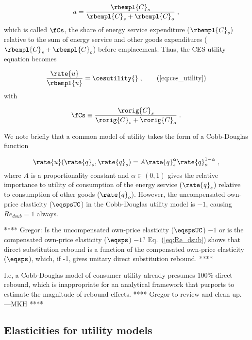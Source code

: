 \begin{equation}
  a = \frac{\rbempl{C}_s}{\rbempl{C}_s + \rbempl{C}_o} \; ,
\end{equation}
%
which is called $\fCs$, 
the share of energy service expenditure ($\rbempl{C}_s$) 
relative to the sum of energy service and other goods expenditures 
($\rbempl{C}_s + \rbempl{C}_o$) 
before emplacement.
Thus, the CES utility equation becomes

\begin{equation} 
    \frac{\rate{u}}{\rbempl{u}} = \cesutility{} \; , \tag{\ref{eq:ces_utility}}
\end{equation}
%
with 

\begin{equation} \label{eq:fCs}
  \fCs \equiv \frac{\rorig{C}_s}{\rorig{C}_s + \rorig{C}_o} \; .
\end{equation}

We note briefly that 
a common model of utility takes the form of a Cobb-Douglas function

\begin{equation} \label{eq:CD_utility}
  \rate{u}(\rate{q}_s,\rate{q}_o) = A \rate{q}_s^\alpha \rate{q}_o^{1 - \alpha} \; ,
\end{equation}
%
where $A$ is a proportionality constant and
$\alpha \in (0,1)$ gives the relative importance to utility
of consumption of the energy service ($\rate{q}_s$)
relative to consumption of other goods ($\rate{q}_o$).
However, the uncompensated own-price elasticity ($\eqspsUC$)
in the Cobb-Douglas utility model is $-1$,
causing $Re_{dsub} = 1$ always.

**** Gregor: Is the uncompensated own-price elasticity ($\eqspsUC$) $-1$
or is the compensated own-price elasticity ($\eqsps$) $-1$?
Eq.~(\ref{eq:Re_dsub}) shows that direct substitution rebound is a function of the
compensated own-price elasticity ($\eqsps$), which, if -1, gives unitary direct substitution rebound.
****

I.e, a Cobb-Douglas model of consumer utility already presumes 100\% direct rebound,
which is inappropriate for an analytical framework that purports to
estimate the magnitude of rebound effects.
**** Gregor to review and clean up. ---MKH ****


\subsection{Elasticities for utility models}
\label{sec:elasticities_for_utility_models}

